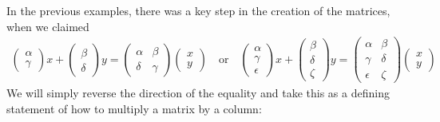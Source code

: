 \noindent In the previous examples, there was a key step in the creation of the matrices, when we claimed
\begin{align*}
\begin{pmatrix}
\alpha \\ \gamma
\end{pmatrix}
x
+
\begin{pmatrix}
\beta \\ \delta
\end{pmatrix}
y
=
\begin{pmatrix}
\alpha &\beta \\ 
\delta & \gamma
\end{pmatrix}
\begin{pmatrix}
x \\ y
\end{pmatrix}
\quad \text{or} \quad
\begin{pmatrix}
\alpha \\ \gamma \\ \epsilon
\end{pmatrix}
x
+
\begin{pmatrix}
\beta \\ \delta \\ \zeta
\end{pmatrix}
y
=
\begin{pmatrix}
 \alpha   & \beta \\
 \gamma   & \delta  \\
 \epsilon & \zeta
\end{pmatrix}
\begin{pmatrix}
x \\ y
\end{pmatrix}
\end{align*}
\noindent We will simply reverse the direction of the equality and take this as a defining statement of how to multiply a matrix by a column:

